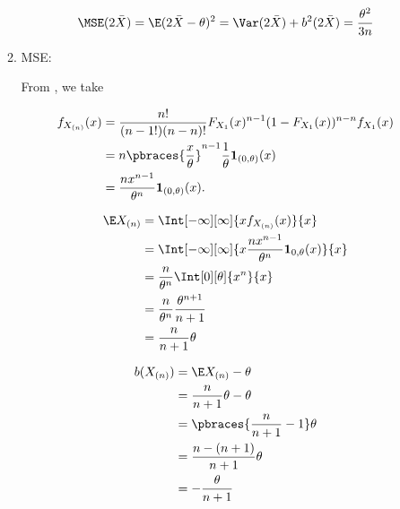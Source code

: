 \begin{solution}
\begin{enumerate}[label = (\alph*)]
\begin{enumerate}[label = \arabic*.]
        \begin{align*}
            \MSE(2 \bar X)
            =
            \E(2 \bar X - \theta)^2
            =
            \Var(2 \bar X) + b^2(2 \bar X)
            =
            \frac{\theta^2}{3 n}
        \end{align*}

        \item MSE:
        
        From \cite[lecture 5, slide 88]{EStat}, we take

        \begin{align*}
            f_{X_{(n)}}(x)
            & =
            \frac{n!}{(n-1!) (n-n)!} F_{X_1}(x)^{n-1} (1 - F_{X_1}(x))^{n-n} f_{X_1}(x) \\
            & =
            n \pbraces{\frac{x}{\theta}}^{n-1} \frac{1}{\theta} \mathbf 1_{(0, \theta)}(x) \\
            & =
            \frac{n x^{n-1}}{\theta^n} \mathbf 1_{(0, \theta)}(x).
        \end{align*}

        \begin{align*}
            \E X_{(n)}
            & =
            \Int[-\infty][\infty]
            {
                x f_{X_{(n)}}(x)
            }{x} \\
            & =            
            \Int[-\infty][\infty]
            {
                x \frac{n x^{n-1}}{\theta^n} \mathbf 1_{0, \theta}(x)
            }{x} \\
            & =
            \frac{n}{\theta^n}
            \Int[0][\theta]
            {
                x^n
            }{x} \\
            & =
            \frac{n}{\theta^n}
            \frac{\theta^{n+1}}{n+1} \\
            & =
            \frac{n}{n+1} \theta
        \end{align*}

        \begin{align*}
            b(X_{(n)})
            & =
            \E X_{(n)} - \theta \\
            & =
            \frac{n}{n+1} \theta - \theta \\
            & =
            \pbraces
            {
                \frac{n}{n+1} - 1
            }
            \theta \\
            & =
            \frac{n - (n+1)}{n+1} \theta \\
            & =
            -\frac{\theta}{n+1}
        \end{align*}


\end{enumerate}
\end{enumerate}
\end{solution}
